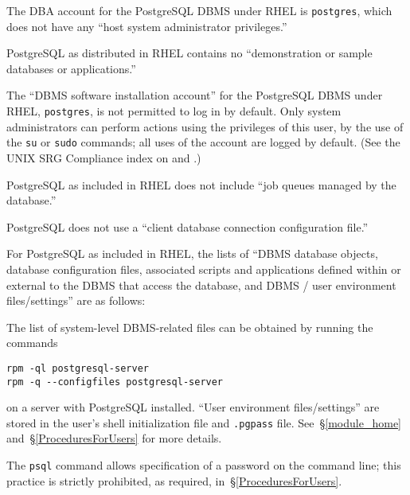 %
The DBA account for the PostgreSQL DBMS under RHEL is \verb!postgres!,
which does not have any ``host system administrator privileges.''

%
PostgreSQL as distributed in RHEL contains no ``demonstration or sample
databases or applications.''

%
The ``DBMS software installation account'' for the PostgreSQL DBMS under
RHEL, \verb!postgres!, is not permitted to log in by default. Only system
administrators can perform actions using the privileges of this user, by
the use of the \verb!su! or \verb!sudo! commands; all uses of the account
are logged by default. (See the UNIX SRG Compliance index on
 and .)

%
PostgreSQL as included in RHEL does not include ``job queues managed by
the database.''

%
PostgreSQL does not use a ``client database connection configuration
file.''

%
For PostgreSQL as included in RHEL, the lists of ``DBMS database
objects, database configuration files, associated scripts and applications
defined within or external to the DBMS that access the database, and DBMS
/ user environment files/settings'' are as follows:

The list of system-level DBMS-related files can be obtained by running the
commands

\begin{verbatim}
rpm -ql postgresql-server
rpm -q --configfiles postgresql-server
\end{verbatim}

on a server with PostgreSQL installed. ``User environment files/settings''
are stored in the user's shell initialization file and \verb!.pgpass!
file. See~\S\ref{module_home} and~\S\ref{ProceduresForUsers} for more
details.

%
The \verb!psql! command allows specification of a password on the command
line; this practice is strictly prohibited, as required,
in~\S\ref{ProceduresForUsers}.

